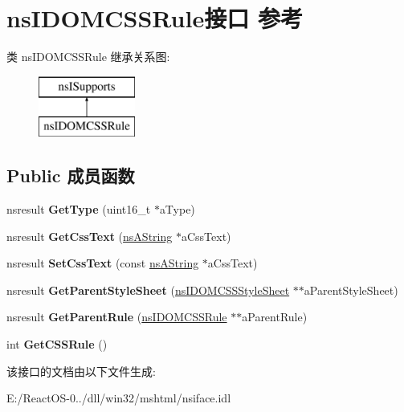 \hypertarget{interfacens_i_d_o_m_c_s_s_rule}{}\section{ns\+I\+D\+O\+M\+C\+S\+S\+Rule接口 参考}
\label{interfacens_i_d_o_m_c_s_s_rule}
类 ns\+I\+D\+O\+M\+C\+S\+S\+Rule 继承关系图\+:\begin{figure}[H]
\begin{center}
\leavevmode
\includegraphics[height=2.000000cm]{interfacens_i_d_o_m_c_s_s_rule}
\end{center}
\end{figure}
\subsection*{Public 成员函数}
\begin{DoxyCompactItemize}
\item 
\mbox{\label{interfacens_i_d_o_m_c_s_s_rule_a232e9c1d0080d247e5fcd53f53393456}} 
nsresult {\bfseries Get\+Type} (uint16\+\_\+t $\ast$a\+Type)
\item 
\mbox{\label{interfacens_i_d_o_m_c_s_s_rule_a9631e8ff4f71f53e125c567908b1dd0b}} 
nsresult {\bfseries Get\+Css\+Text} (\hyperlink{structns_string_container}{ns\+A\+String} $\ast$a\+Css\+Text)
\item 
\mbox{\label{interfacens_i_d_o_m_c_s_s_rule_ab0953ca7214687b114497d2960014b9d}} 
nsresult {\bfseries Set\+Css\+Text} (const \hyperlink{structns_string_container}{ns\+A\+String} $\ast$a\+Css\+Text)
\item 
\mbox{\label{interfacens_i_d_o_m_c_s_s_rule_af9b4867c22584e0e42d1415aa8f17869}} 
nsresult {\bfseries Get\+Parent\+Style\+Sheet} (\hyperlink{interfacens_i_d_o_m_c_s_s_style_sheet}{ns\+I\+D\+O\+M\+C\+S\+S\+Style\+Sheet} $\ast$$\ast$a\+Parent\+Style\+Sheet)
\item 
\mbox{\label{interfacens_i_d_o_m_c_s_s_rule_a6560e9ccb7c76713c74d0187b31389af}} 
nsresult {\bfseries Get\+Parent\+Rule} (\hyperlink{interfacens_i_d_o_m_c_s_s_rule}{ns\+I\+D\+O\+M\+C\+S\+S\+Rule} $\ast$$\ast$a\+Parent\+Rule)
\item 
\mbox{\label{interfacens_i_d_o_m_c_s_s_rule_a85b9e685363e3fda074444808107590c}} 
int {\bfseries Get\+C\+S\+S\+Rule} ()
\end{DoxyCompactItemize}


该接口的文档由以下文件生成\+:\begin{DoxyCompactItemize}
\item 
E\+:/\+React\+O\+S-\/0../dll/win32/mshtml/nsiface.\+idl\end{DoxyCompactItemize}

